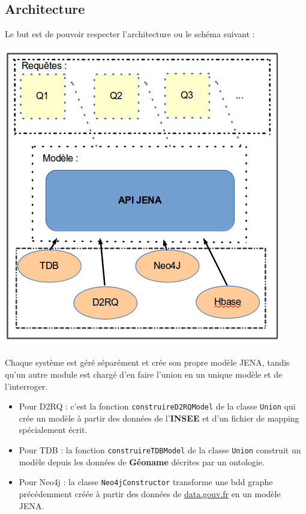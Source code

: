 \documentclass{article}
\begin{document}
\subsection{Architecture}
Le but est de pouvoir respecter l'architecture ou le schéma suivant : \\
\begin{center}
\includegraphics[scale=0.5]{archi_appli.png} 
\label{fig_appli}
\end{center}
Chaque système est géré séparément et crée son propre modèle JENA, tandis qu'un autre module est chargé d'en faire l'union en un unique modèle et de l'interroger.

\begin{itemize}
\item Pour D2RQ : c'est la fonction \texttt{construireD2RQModel} de la classe \texttt{Union} qui crée un modèle à partir des données de l'\textbf{INSEE} et d'un fichier de mapping spécialement écrit.
\item Pour TDB : la fonction \texttt{construireTDBModel} de la classe \texttt{Union} construit un modèle depuis les données de \textbf{Géoname} décrites par un ontologie.
\item Pour Neo4j : la classe \texttt{Neo4jConstructor} transforme une bdd graphe précédemment créée à partir des données de \href{http://www.data.gouv.fr/fr}{data.gouv.fr} en un modèle JENA.


\end{itemize}
\end{document}
